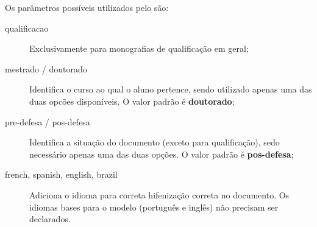 Os parâmetros possíveis utilizados pelo  são:
\begin{description}
\item[qualificacao] Exclusivamente para monografias de qualificação em geral;
\item[mestrado / doutorado] Identifica o curso ao qual o aluno pertence, sendo utilizado apenas uma das duas opcões disponíveis. O valor padrão é \textbf{doutorado};
\item[pre-defesa / pos-defesa] Identifica a situação do documento (exceto para qualificação), sedo necessário apenas uma das duas opções. O valor padrão é \textbf{pos-defesa};
\item[french, spanish, english, brazil] Adiciona o idioma para correta hifenização correta no documento. Os idiomas bases para o modelo (português e inglês) não precisam ser declarados.
\end{description}
